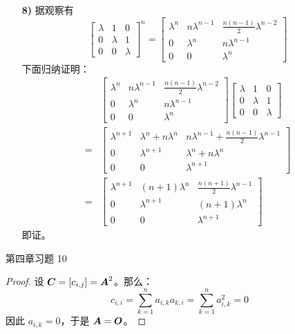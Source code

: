 \begin{problem}
\begin{solution}
\begin{enumerate}
			\item[\textbf{8)}] 据观察有
			$$
			\begin{bmatrix}
				\lambda & 1 & 0 \\
				0 & \lambda & 1 \\
				0 & 0 & \lambda
			\end{bmatrix}^n = \begin{bmatrix}
				\lambda^n & n \lambda^{n-1} & \frac{n(n-1)}{2} \lambda^{n-2} \\
				0 & \lambda^n & n \lambda^{n-1} \\
				0 & 0 & \lambda^n
			\end{bmatrix}
			$$
			下面归纳证明：
			$$
			\begin{aligned}
				& \begin{bmatrix}
					\lambda^n & n \lambda^{n-1} & \frac{n(n-1)}{2} \lambda^{n-2} \\
					0 & \lambda^n & n \lambda^{n-1} \\
					0 & 0 & \lambda^n
				\end{bmatrix} \begin{bmatrix}
					\lambda & 1 & 0 \\
					0 & \lambda & 1 \\
					0 & 0 & \lambda
				\end{bmatrix} \\
				= & \begin{bmatrix}
					\lambda^{n+1} & \lambda^n + n \lambda^n & n \lambda^{n-1} + \frac{n(n-1)}{2} \lambda^{n-1} \\
					0 & \lambda^{n+1} & \lambda^n + n \lambda^n \\
					0 & 0 & \lambda^{n+1}
				\end{bmatrix} \\
				= & \begin{bmatrix}
					\lambda^{n+1} & (n+1)\lambda^n & \frac{n(n+1)}{2} \lambda^{n-1} \\
					0 & \lambda^{n+1} & (n+1)\lambda^n \\
					0 & 0 & \lambda^{n+1}
				\end{bmatrix}
			\end{aligned}
			$$
			即证。
		\end{enumerate}
	\end{solution}
\end{problem}

\begin{problem}
	第四章习题 10

	\begin{proof}
		设 $\boldsymbol{C} = [c_{i,j}] = \boldsymbol{A}^2$。那么：
		$$
		c_{i,i} = \sum_{k=1}^n a_{i,k} a_{k,i} = \sum_{k=1}^n a_{i,k}^2 = 0
		$$
		因此 $a_{i,k} = 0$，于是 $\boldsymbol{A} = \boldsymbol{O}$。
	\end{proof}
\end{problem}

